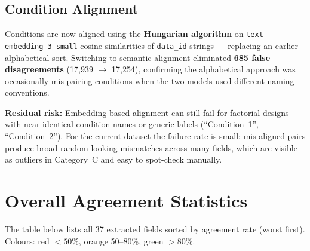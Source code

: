 \documentclass[11pt,a4paper]{article}
\begin{document}
        \subsection{Condition Alignment}
        Conditions are now aligned using the \textbf{Hungarian algorithm} on
        \texttt{text-embedding-3-small} cosine similarities of \texttt{data\_id}
        strings --- replacing an earlier alphabetical sort.
        Switching to semantic alignment eliminated \textbf{685 false disagreements}
        (17{,}939 $\rightarrow$ 17{,}254), confirming the alphabetical approach was
        occasionally mis-pairing conditions when the two models used different naming
        conventions.

        \textbf{Residual risk:} Embedding-based alignment can still fail for
        factorial designs with near-identical condition names or generic labels
        (``Condition~1'', ``Condition~2'').  For the current dataset the failure
        rate is small: mis-aligned pairs produce broad random-looking mismatches
        across many fields, which are visible as outliers in Category~C and easy
        to spot-check manually.


\section{Overall Agreement Statistics}

The table below lists all 37 extracted fields sorted by agreement rate (worst first).  Colours: \colorbox{red!18}{red} $<50\%$, \colorbox{orange!28}{orange} 50--80\%, \colorbox{green!18}{green} $>80\%$.
\end{document}
